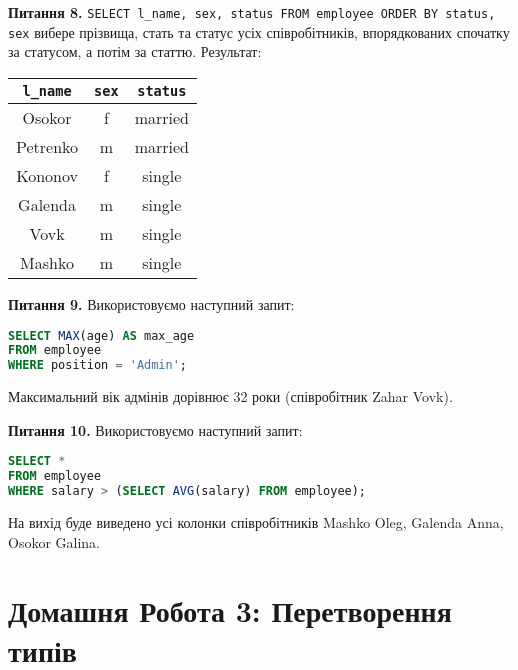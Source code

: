 \documentclass{hw_template}
\begin{document}
\textbf{Питання 8.} \texttt{SELECT l\_name, sex, status FROM employee ORDER BY
status, sex} вибере прізвища, стать та статус усіх співробітників, впорядкованих
спочатку за статусом, а потім за статтю. Результат:

\begin{table}[H]
    \centering
    \begin{tabular}{|c|c|c|}
        \hline
        \texttt{l\_name} & \texttt{sex} & \texttt{status} \\
        \hline
        Osokor & f &  married  \\
        Petrenko &  m &  married  \\            
        Kononov & f & single \\       
        Galenda & m & single \\           
        Vovk & m & single \\           
        Mashko & m & single \\
        \hline
    \end{tabular}
\end{table}

\textbf{Питання 9.} Використовуємо наступний запит:  
\begin{lstlisting}[language=SQL]
SELECT MAX(age) AS max_age
FROM employee
WHERE position = 'Admin';  
\end{lstlisting}

Максимальний вік адмінів дорівнює 32 роки (співробітник Zahar Vovk).

\textbf{Питання 10.} Використовуємо наступний запит:
\begin{lstlisting}[language=SQL]
SELECT *
FROM employee
WHERE salary > (SELECT AVG(salary) FROM employee);
\end{lstlisting}

На вихід буде виведено усі колонки співробітників Mashko Oleg, Galenda Anna, 
Osokor Galina.

\newpage

\section{Домашня Робота 3: Перетворення типів}
\end{document}
